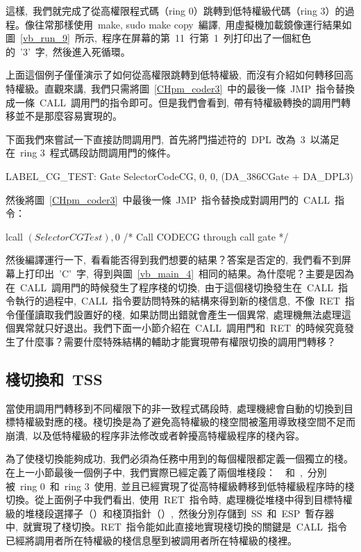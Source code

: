 這樣,~我們就完成了從高權限程式碼（ring 0）跳轉到低特權級代碼（ring 3）的過程。像往常那樣使用~make, sudo make copy~編譯,~用虛擬機加載鏡像運行結果如圖~\ref{vb_run_9}~所示,~程序在屏幕的第~11~行第~1~列打印出了一個紅色的~'3'~字,~然後進入死循環。


上面這個例子僅僅演示了如何從高權限跳轉到低特權級,~而沒有介紹如何轉移回高特權級。直觀來講,~我們只需將圖~\ref{CHpm_coder3}~中的最後一條~JMP~指令替換成一條~CALL~調用門的指令即可。但是我們會看到,~帶有特權級轉換的調用門轉移並不是那麼容易實現的。

下面我們來嘗試一下直接訪問調用門,~首先將門描述符的~DPL~改為~3~以滿足在~ring 3~程式碼段訪問調用門的條件。

\begin{Command}
LABEL_CG_TEST:      Gate    SelectorCodeCG, 0, 0, (DA_386CGate + DA_DPL3)
\end{Command}

然後將圖~\ref{CHpm_coder3}~中最後一條~JMP~指令替換成對調用門的~CALL~指令：

\begin{Command}
lcall   $(SelectorCGTest), $0  /* Call CODECG through call gate */
\end{Command}

然後編譯運行一下,~看看能否得到我們想要的結果？答案是否定的,~我們看不到屏幕上打印出~'C'~字,~得到與圖~\ref{vb_main_4}~相同的結果。為什麼呢？主要是因為在~CALL~調用門的時候發生了程序棧的切換,~由于這個棧切換發生在~CALL~指令執行的過程中,~CALL~指令要訪問特殊的結構來得到新的棧信息,~不像~RET~指令僅僅讀取我們設置好的棧,~如果訪問出錯就會產生一個異常,~處理機無法處理這個異常就只好退出。我們下面一小節介紹在~CALL~調用門和~RET~的時候究竟發生了什麼事？需要什麼特殊結構的輔助才能實現帶有權限切換的調用門轉移？

\subsection{棧切換和~TSS}

當使用調用門轉移到不同權限下的非一致程式碼段時,~處理機總會自動的切換到目標特權級對應的棧。棧切換是為了避免高特權級的棧空間被濫用導致棧空間不足而崩潰,~以及低特權級的程序非法修改或者幹擾高特權級程序的棧內容。

為了使棧切換能夠成功,~我們必須為任務中用到的每個權限都定義一個獨立的棧。在上一小節最後一個例子中,~我們實際已經定義了兩個堆棧段：~~和~,~分別被~ring 0~和~ring 3~使用,~並且已經實現了從高特權級轉移到低特權級程序時的棧切換。從上面例子中我們看出,~使用~RET~指令時,~處理機從堆棧中得到目標特權級的堆棧段選擇子（）和棧頂指針（）,~然後分別存儲到~SS~和~ESP~暫存器中,~就實現了棧切換。RET~指令能如此直接地實現棧切換的關鍵是~CALL~指令已經將調用者所在特權級的棧信息壓到被調用者所在特權級的棧裡。

